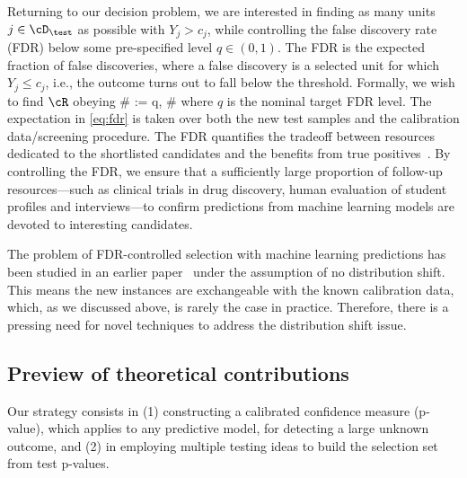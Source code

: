 Returning to our decision problem,
we are interested in finding as many units $j\in \cD_\test$ as possible
with $Y_{j}>c_j$, while controlling the false discovery rate (FDR)
below some pre-specified level $q\in (0,1)$.
The FDR is the expected fraction  of false discoveries, where a false discovery is a selected unit for which $Y_j \le c_j$, i.e., the outcome turns out to fall below the threshold.
Formally, we wish to find $\cR$ obeying
\#\label{eq:fdr}
\fdr := \EE{} \leq q,
\#
where $q$ is the nominal target FDR level. The expectation in \eqref{eq:fdr} is taken
over both the new test samples and the calibration data/screening procedure.
The FDR quantifies the tradeoff
between resources dedicated to the shortlisted candidates
and the benefits from true positives~\cite{benjamini1995controlling}.
By controlling the FDR, we ensure that a sufficiently large proportion of
follow-up resources---such as clinical trials
in drug discovery, human evaluation of student profiles and interviews---to confirm predictions from machine learning models are
devoted to interesting candidates.

The problem of FDR-controlled selection with machine learning predictions
has been studied in an earlier paper~\cite{jin2022selection}
under the assumption of no distribution shift.
This means the new instances
are exchangeable with the known calibration data, which, as we discussed above,
is rarely the case in practice. %
{Therefore, there is a pressing need for novel techniques
to address the distribution shift issue.}

\vspace{-0.3em}


\subsection{Preview of theoretical contributions}

{Our strategy consists in (1) constructing a calibrated confidence measure (p-value), which applies to any predictive model, for detecting a large unknown outcome, and (2) in employing multiple testing ideas to build the selection set from test p-values. }

\vspace{-0.5em}
